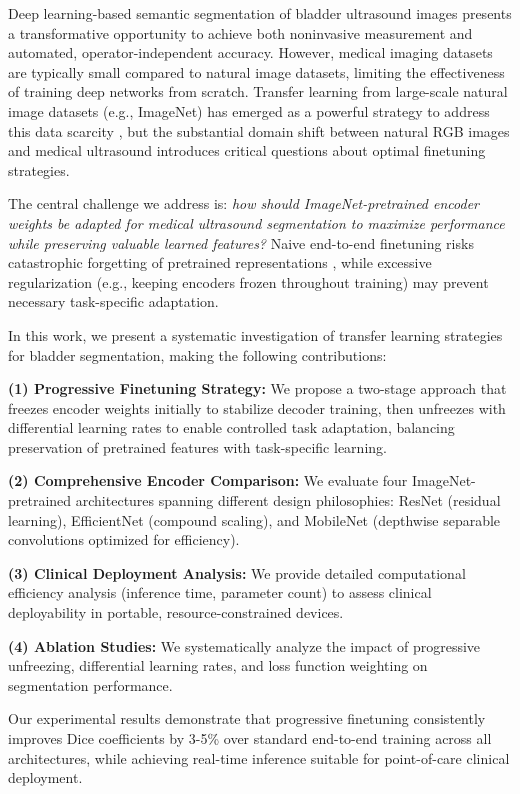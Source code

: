 \documentclass{article}
\begin{document}
Deep learning-based semantic segmentation of bladder ultrasound images presents a transformative opportunity to achieve both noninvasive measurement and automated, operator-independent accuracy. However, medical imaging datasets are typically small compared to natural image datasets, limiting the effectiveness of training deep networks from scratch. Transfer learning from large-scale natural image datasets (e.g., ImageNet) has emerged as a powerful strategy to address this data scarcity \cite{ref4,ref5}, but the substantial domain shift between natural RGB images and medical ultrasound introduces critical questions about optimal finetuning strategies.

The central challenge we address is: \textit{how should ImageNet-pretrained encoder weights be adapted for medical ultrasound segmentation to maximize performance while preserving valuable learned features?} Naive end-to-end finetuning risks catastrophic forgetting of pretrained representations \cite{ref6}, while excessive regularization (e.g., keeping encoders frozen throughout training) may prevent necessary task-specific adaptation.

In this work, we present a systematic investigation of transfer learning strategies for bladder segmentation, making the following contributions:

\textbf{(1) Progressive Finetuning Strategy:} We propose a two-stage approach that freezes encoder weights initially to stabilize decoder training, then unfreezes with differential learning rates to enable controlled task adaptation, balancing preservation of pretrained features with task-specific learning.

\textbf{(2) Comprehensive Encoder Comparison:} We evaluate four ImageNet-pretrained architectures spanning different design philosophies: ResNet (residual learning), EfficientNet (compound scaling), and MobileNet (depthwise separable convolutions optimized for efficiency).

\textbf{(3) Clinical Deployment Analysis:} We provide detailed computational efficiency analysis (inference time, parameter count) to assess clinical deployability in portable, resource-constrained devices.

\textbf{(4) Ablation Studies:} We systematically analyze the impact of progressive unfreezing, differential learning rates, and loss function weighting on segmentation performance.

Our experimental results demonstrate that progressive finetuning consistently improves Dice coefficients by 3-5\% over standard end-to-end training across all architectures, while achieving real-time inference suitable for point-of-care clinical deployment.
\end{document}
